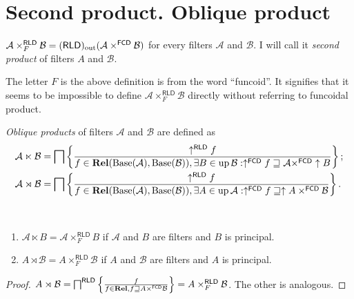 \section{Second product. Oblique product}
\begin{defn}
$\mathcal{A}\times_{F}^{\mathsf{RLD}}\mathcal{B}=(\mathsf{RLD})_{\mathrm{out}}(\mathcal{A}\times^{\mathsf{FCD}}\mathcal{B})$
for every filters $\mathcal{A}$ and $\mathcal{B}$. I will call it
\emph{second product} of filters $A$ and $\mathcal{B}$.\end{defn}
\begin{rem}
The letter $F$ is the above definition is from the word ``funcoid''.
It signifies that it seems to be impossible to define $\mathcal{A}\times_{F}^{\mathsf{RLD}}\mathcal{B}$
directly without referring to funcoidal product.\end{rem}
\begin{defn}
\emph{Oblique products} of filters $\mathcal{A}$
and $\mathcal{B}$ are defined as
\begin{align*}
\mathcal{A}\ltimes\mathcal{B} & =\bigsqcap\left\{ \frac{\uparrow^{\mathsf{RLD}}f}{f\in\mathbf{Rel}(\operatorname{Base}(\mathcal{A}),\operatorname{Base}(\mathcal{B})),\exists B\in\operatorname{up}\mathcal{B}:\uparrow^{\mathsf{FCD}}f\sqsupseteq\mathcal{A}\times^{\mathsf{FCD}}\uparrow B}\right\};\\
\mathcal{A}\rtimes\mathcal{B} & =\bigsqcap\left\{ \frac{\uparrow^{\mathsf{RLD}}f}{f\in\mathbf{Rel}(\operatorname{Base}(\mathcal{A}),\operatorname{Base}(\mathcal{B})),\exists A\in\operatorname{up}\mathcal{A}:\uparrow^{\mathsf{FCD}}f\sqsupseteq\uparrow A\times^{\mathsf{FCD}}\mathcal{B}}\right\}.
\end{align*}
\end{defn}

\begin{prop}
  ~
  \begin{enumerate}
    \item $\mathcal{A} \ltimes B = \mathcal{A} \times^{\mathsf{RLD}}_F
    B$ if $\mathcal{A}$ and $B$ are filters and $B$ is principal.
    
    \item $A \rtimes \mathcal{B} = A \times^{\mathsf{RLD}}_F
    \mathcal{B}$ if $A$ and $\mathcal{B}$ are filters and $A$ is principal.
  \end{enumerate}
\end{prop}

\begin{proof}
  $A \rtimes \mathcal{B} = \bigsqcap^{\mathsf{RLD}} \left\{ \frac{ f
  }{ f \in \mathbf{Rel}, f \sqsupseteq A
  \times^{\mathsf{FCD}} \mathcal{B} }\right\} = A
  \times^{\mathsf{RLD}}_F \mathcal{B}$. The other is analogous.
\end{proof}

